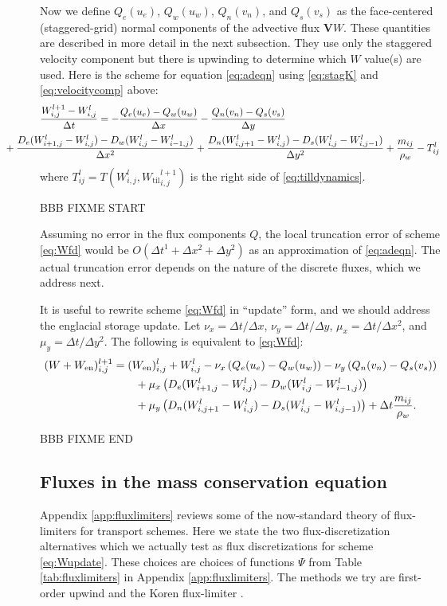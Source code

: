 \documentclass[11pt,final]{amsart}
\newcommand\bV{\mathbf{V}}
\newcommand{\Wtil}{W_{\text{til}}}
\newcommand{\Wen}{W_{\text{en}}}
\newcommand{\Wlij}{W^l_{i,j}}
\begin{document}
Now we define $Q_e(u_e)$, $Q_w(u_w)$, $Q_n(v_n)$, and $Q_s(v_s)$ as the face-centered (staggered-grid) normal components of the advective flux $\bV W$.  These quantities are described in more detail in the next subsection.  They use only the staggered velocity component but there is upwinding to determine which $W$ value(s) are used.  Here is the scheme for equation \eqref{eq:adeqn} using \eqref{eq:stagK} and \eqref{eq:velocitycomp} above:
\begin{align}
 &\frac{W_{i,j}^{l+1} - W_{i,j}^l}{\Delta t} = - \frac{Q_e(u_e) - Q_w(u_w)}{\Delta x} - \frac{Q_n(v_n) - Q_s(v_s)}{\Delta y} \label{eq:Wfd} \\
      &\hspace{-0.5in} + \frac{D_e (W_{i+1,j}^l - \Wlij) - D_w (\Wlij - W_{i-1,j}^l)}{\Delta x^2} + \frac{D_n (W_{i,j+1}^l - \Wlij) - D_s (\Wlij - W_{i,j-1}^l)}{\Delta y^2}  + \frac{m_{ij}}{\rho_w} - T_{ij}^l \notag
\end{align}
where $T_{ij}^l=T(W_{i,j}^l,{\Wtil}_{i,j}^{l+1})$ is the right side of \eqref{eq:tilldynamics}.

BBB FIXME START

Assuming no error in the flux components $Q$, the local truncation error \citep{MortonMayers} of scheme \eqref{eq:Wfd} would be $O(\Delta t^1 + \Delta x^2 + \Delta y^2)$ as an approximation of \eqref{eq:adeqn}.  The actual truncation error depends on the nature of the discrete fluxes, which we address next.

It is useful to rewrite scheme \eqref{eq:Wfd} in ``update'' form, and we should address the englacial storage update.  Let $\nu_x = \Delta t/\Delta x$, $\nu_y = \Delta t/\Delta y$, $\mu_x = \Delta t/\Delta x^2$, and $\mu_y = \Delta t/\Delta y^2$.  The following is equivalent to \eqref{eq:Wfd}:
\begin{align}
 (W+\Wen)_{i,j}^{l+1} &= (\Wen)_{i,j}^l + W_{i,j}^l - \nu_x \left(Q_e(u_e) - Q_w(u_w)\right) - \nu_y \left(Q_n(v_n) - Q_s(v_s)\right) \label{eq:Wupdate} \\
  &\qquad + \mu_x \left(D_e (W_{i+1,j}^l - \Wlij) - D_w (\Wlij - W_{i-1,j}^l)\right) \notag \\
  &\qquad + \mu_y \left(D_n (W_{i,j+1}^l - \Wlij) - D_s (\Wlij - W_{i,j-1}^l)\right) + \Delta t \frac{m_{ij}}{\rho_w}. \notag
\end{align}

BBB FIXME END


\subsection*{Fluxes in the mass conservation equation}  Appendix \ref{app:fluxlimiters} reviews some of the now-standard theory of flux-limiters for transport schemes.  Here we state the two flux-discretization alternatives which we actually test as flux discretizations for scheme \eqref{eq:Wupdate}.  These choices are choices of functions $\Psi$ from Table \ref{tab:fluxlimiters} in Appendix \ref{app:fluxlimiters}.  The methods we try are first-order upwind and the Koren flux-limiter \citep{HundsdorferVerwer2010}.
\end{document}
